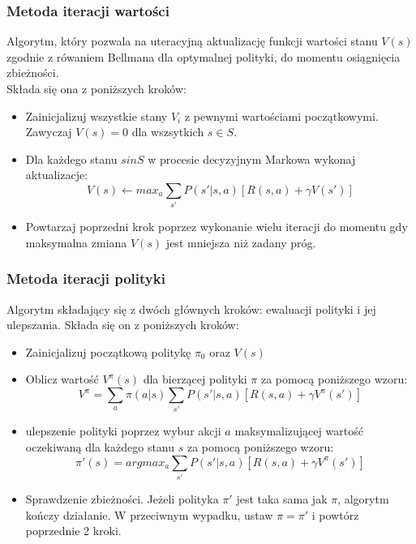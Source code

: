 \documentclass[a4paper, 12pt]{article}
\begin{document}
    \subsubsection{Metoda iteracji wartości}
    Algorytm, który pozwala na uteracyjną aktualizację funkcji wartości stanu \( V(s) \) zgodnie z rówaniem Bellmana dla optymalnej polityki, do momentu osiągnięcia zbieżności.
    \\ Składa się ona z poniższych kroków:
    \begin{itemize}
        \item Zainicjalizuj wszystkie stany \( V_i \) z pewnymi wartościami początkowymi. Zawyczaj \( V(s) = 0 \) dla wszsytkich \( s \in S \).
        \item Dla każdego stanu \( s in S \) w procesie decyzyjnym Markowa wykonaj aktualizacje:
        \[ V(s) \leftarrow max_a \sum_{s'} P(s'|s,a)[R(s,a) + \gamma V(s')] \]
        \item Powtarzaj poprzedni krok poprzez wykonanie wielu iteracji do momentu gdy maksymalna zmiana \( V(s) \) jest mniejsza niż zadany próg. 
    \end{itemize}
    \subsubsection{Metoda iteracji polityki}
    Algorytm składający się z dwóch głównych kroków: ewaluacji polityki i jej ulepszania. Składa się on z poniższych kroków:
    \begin{itemize} 
        \item Zainicjalizuj początkową politykę \( \pi_0 \) oraz \( V(s) \)
        \item Oblicz wartość \( V^\pi (s) \) dla bierzącej polityki \( \pi \) za pomocą poniższego wzoru:
        \[ V^\pi = \sum_{a} \pi(a|s) \sum_{s'} P(s'|s,a) [R(s,a) + \gamma V^\pi(s')] \]
        \item ulepszenie polityki poprzez wybur akcji \( a \) maksymalizującej wartość oczekiwaną dla każdego stanu \( s \) za pomocą poniższego wzoru:
        \[ \pi'(s) = argmax_a \sum_{s'} P(s'|s,a) [R(s,a) + \gamma V^\pi(s')] \]
        \item Sprawdzenie zbieżności. Jeżeli polityka \( \pi' \) jest taka sama jak \( \pi \), algorytm kończy działanie.
        W przeciwnym wypadku, ustaw \( \pi = \pi' \) i powtórz poprzednie 2 kroki. 
    \end{itemize}
\end{document}
